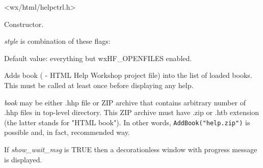<wx/html/helpctrl.h>


\label{wxhtmlhelpcontrollerwxhtmlhelpcontroller}


Constructor.


{\it style} is combination of these flags:

\begin{twocollist}\itemsep=0pt
\end{twocollist}

Default value: everything but wxHF\_OPENFILES enabled.

\label{wxhtmlhelpcontrolleraddbook}


Adds book ( - HTML Help Workshop project file) into the list of loaded books.
This must be called at least once before displaying  any help.

{\it book} may be either .hhp file or ZIP archive that contains arbitrary number of .hhp files in 
top-level directory. This ZIP archive must have .zip or .htb extension
(the latter stands for "HTML book"). In other words, {\tt AddBook("help.zip")} is possible and, in fact,
recommended way.

If {\it show\_wait\_msg} is TRUE then a decorationless window with progress message is displayed.

\label{wxhtmlhelpcontrollercreatehelpframe}


